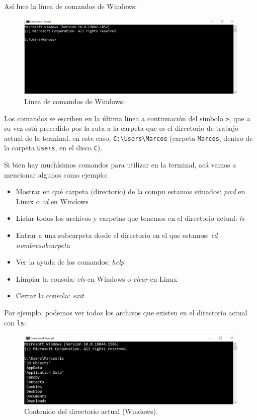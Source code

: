 \documentclass[
]{book}
\providecommand{\tightlist}{%
  \setlength{\itemsep}{0pt}\setlength{\parskip}{0pt}}
\begin{document}
Así luce la línea de comandos de Windows:

\begin{figure}

{\centering \includegraphics[width=0.8\linewidth]{images/07_otros/terminal2} 

}

\caption{Línea de comandos de Windows.}\label{fig:unnamed-chunk-170}
\end{figure}

Los comandos se escriben en la última línea a continuación del símbolo \texttt{\textgreater{}}, que a su vez está precedido por la ruta a la carpeta que es el directorio de trabajo actual de la terminal, en este caso, \texttt{C:\textbackslash{}Users\textbackslash{}Marcos} (carpeta \texttt{Marcos}, dentro de la carpeta \texttt{Users}, en el disco \texttt{C}).

Si bien hay muchísimos comandos para utilizar en la terminal, acá vamos a mencionar algunos como ejemplo:

\begin{itemize}
\tightlist
\item
  Mostrar en qué carpeta (directorio) de la compu estamos situados: \emph{pwd} en Linux o \emph{cd} en Windows
\item
  Listar todos los archivos y carpetas que tenemos en el directorio actual: \emph{ls}
\item
  Entrar a una subcarpeta desde el directorio en el que estamos: \emph{cd nombresubcarpeta}
\item
  Ver la ayuda de los comandos: \emph{help}
\item
  Limpiar la consola: \emph{cls} en Windows o \emph{clear} en Linux
\item
  Cerrar la consola: \emph{exit}
\end{itemize}

Por ejemplo, podemos ver todos los archivos que existen en el directorio actual con \texttt{ls}:

\begin{figure}

{\centering \includegraphics[width=0.8\linewidth]{images/07_otros/terminal3} 

}

\caption{Contenido del directorio actual (Windows).}\label{fig:unnamed-chunk-171}
\end{figure}
\end{document}
